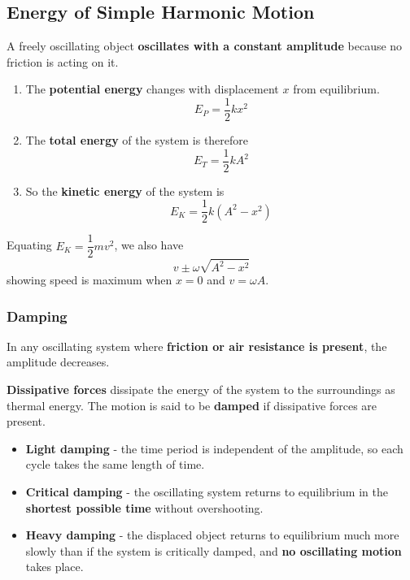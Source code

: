 \subsection{Energy of Simple Harmonic Motion}

A freely oscillating object \textbf{oscillates with a constant amplitude} because no friction is acting on it.
\begin{enumerate}
    \item The \textbf{potential energy} changes with displacement $x$ from equilibrium.
        $$E_P=\frac{1}{2}kx^2$$
    \item The \textbf{total energy} of the system is therefore
        $$E_T=\frac{1}{2}kA^2$$
    \item So the \textbf{kinetic energy} of the system is
        $$E_K=\frac{1}{2}k(A^2-x^2)$$
\end{enumerate}

Equating $E_K=\dfrac{1}{2}mv^2$, we also have
$$v\pm\omega\sqrt{A^2-x^2}$$
showing speed is maximum when $x=0$ and $v=\omega A$.

\subsubsection*{Damping}

In any oscillating system where \textbf{friction or air resistance is present}, the amplitude decreases.

\textbf{Dissipative forces} dissipate the energy of the system to the surroundings as thermal energy. The motion is said to be \textbf{damped} if dissipative forces are present.
\begin{itemize}
    \item \textbf{Light damping} - the time period is independent of the amplitude, so each cycle takes the same length of time.
    \item \textbf{Critical damping} - the oscillating system returns to equilibrium in the \textbf{shortest possible time} without overshooting.
    \item \textbf{Heavy damping} - the displaced object returns to equilibrium much more slowly than if the system is critically damped, and \textbf{no oscillating motion} takes place.
\end{itemize}
